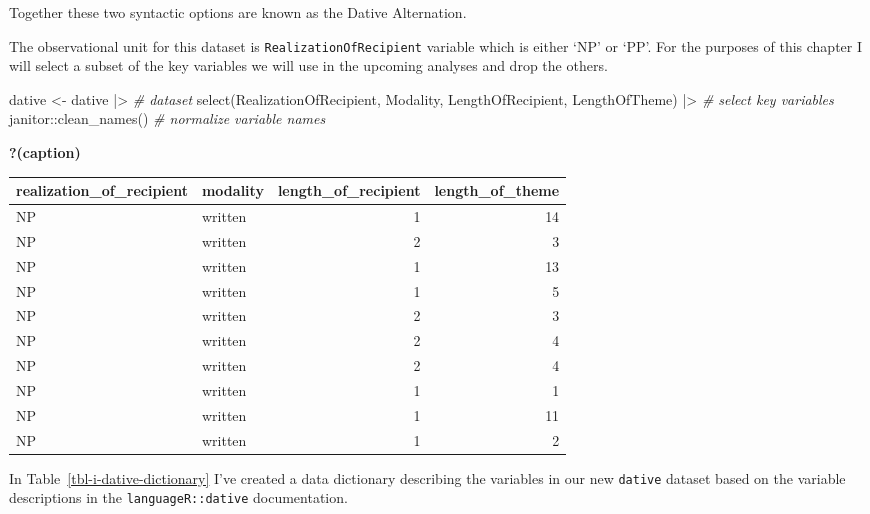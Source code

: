 \documentclass[
  letterpaper,
]{latex/krantz}
\newenvironment{Shaded}{\begin{snugshade}}{\end{snugshade}}
\newcommand{\CommentTok}[1]{\textcolor[rgb]{0.00,0.00,0.00}{\textit{#1}}}
\newcommand{\FunctionTok}[1]{\textcolor[rgb]{0.00,0.00,0.00}{#1}}
\newcommand{\NormalTok}[1]{\textcolor[rgb]{0.00,0.00,0.00}{#1}}
\newcommand{\OtherTok}[1]{\textcolor[rgb]{0.00,0.00,0.00}{#1}}
\newcommand{\SpecialCharTok}[1]{\textcolor[rgb]{0.00,0.00,0.00}{#1}}
\begin{document}
Together these two syntactic options are known as the Dative
Alternation.

The observational unit for this dataset is
\texttt{RealizationOfRecipient} variable which is either `NP' or `PP'.
For the purposes of this chapter I will select a subset of the key
variables we will use in the upcoming analyses and drop the others.

\begin{Shaded}
\begin{Highlighting}[]
\NormalTok{dative }\OtherTok{\textless{}{-}} 
\NormalTok{  dative }\SpecialCharTok{|\textgreater{}} \CommentTok{\# dataset}
  \FunctionTok{select}\NormalTok{(RealizationOfRecipient, Modality, LengthOfRecipient, LengthOfTheme) }\SpecialCharTok{|\textgreater{}} \CommentTok{\# select key variables}
\NormalTok{  janitor}\SpecialCharTok{::}\FunctionTok{clean\_names}\NormalTok{() }\CommentTok{\# normalize variable names}
\end{Highlighting}
\end{Shaded}

\begin{table}

\caption{\textbf{?(caption)}}

\end{table}

\begin{tabular}{llrr}
\toprule
realization\_of\_recipient & modality & length\_of\_recipient & length\_of\_theme\\
\midrule
NP & written & 1 & 14\\
NP & written & 2 & 3\\
NP & written & 1 & 13\\
NP & written & 1 & 5\\
NP & written & 2 & 3\\
\addlinespace
NP & written & 2 & 4\\
NP & written & 2 & 4\\
NP & written & 1 & 1\\
NP & written & 1 & 11\\
NP & written & 1 & 2\\
\bottomrule
\end{tabular}

In Table~\ref{tbl-i-dative-dictionary} I've created a data dictionary
describing the variables in our new \texttt{dative} dataset based on the
variable descriptions in the \texttt{languageR::dative} documentation.
\end{document}
